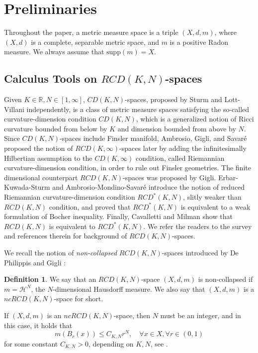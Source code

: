 \documentclass{article}
\theoremstyle{remark}
\numberwithin{equation}{section}
\theoremstyle{definition}
\newtheorem{definition}{Definition}[section]
\begin{document}
\section{Preliminaries}
    Throughout the paper, a metric measure space is a triple $(X,d,m)$, where $(X,d)$ is a complete, separable metric space, and $m$ is a positive Radon measure. We always assume that $\mathrm{supp} (m) = X$.
    \subsection{Calculus Tools on $RCD(K,N)$-spaces}
    Given $K \in \mathbb{R}, N \in [1,\infty]$, $CD(K,N)$-spaces, proposed by Sturm\cite{Sturm_2006_1,Sturm_2006_2} and Lott-Villani\cite{Lott-Villani_2009} independently, is a class of metric measure spaces satisfying the so-called curvature-dimension condition $CD(K,N)$, which is a generalized notion of Ricci curvature bounded from below by $K$ and dimension bounded from above by $N$. Since $CD(K,N)$-spaces include Finsler manifold, Ambrosio, Gigli, and Savar\'{e}\cite{Ambrosio-Gigli-Savare_2014} proposed the notion of $RCD(K,\infty)$-spaces later by adding the infinitesimally Hilbertian assumption to the $CD(K,\infty)$ condition, called Riemannian curvature-dimension condition, in order to rule out Finsler geometries. The finite dimensional counterpart $RCD(K,N)$-spaces was proposed by Gigli\cite{Gigli_2015}. Erbar-Kuwada-Sturm\cite{Erbar-Kuwada-Sturm_2015} and Ambrosio-Mondino-Savar\'{e}\cite{Ambrosio-Mondino-Savare_2016} introduce the notion of reduced Riemannian curvature-dimension condition $RCD^{*}(K,N)$, slitly weaker than $RCD(K,N)$ condition, and proved that $RCD^{*}(K,N)$ is equivalent to a weak formulation of Bocher inequality. Finally, Cavalletti and Milman\cite{Cavalletti-Milman_2021} show that $RCD(K,N)$ is equivalent to $RCD^{*}(K,N)$. We refer the readers to the survey\cite{Ambrosio_2018} and references therein for background of $RCD(K,N)$-spaces.
    
    We recall the notion of \emph{non-collapsed} $RCD(K,N)$-spaces introduced by De Philippis and Gigli \cite{DePhilippis-Gigli_2018}:
    \begin{definition}
    	We say that an $RCD(K,N)$-space $(X,d,m)$ is non-collapsed if $m = \mathcal{H}^{N}$, the $N$-dimensional Hausdorff measure. We also say that $(X,d,m)$ is a $ncRCD(K,N)$-space for short.
    \end{definition}
     If $(X,d,m)$ is an $ncRCD(K,N)$-space, then $N$ must be an integer, and in this case, it holds that
     \begin{equation}
     	m(B_{r}(x)) \le C_{K,N}r^{N}, \quad \forall x \in X, \forall r \in (0,1)
     \end{equation} 
     for some constant $C_{K,N} > 0$, depending on $K,N$, see \cite[Corollary 2.14]{DePhilippis-Gigli_2018}.
     
\end{document}
